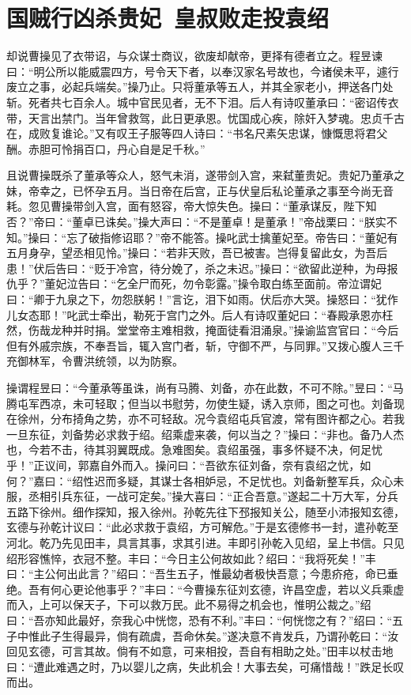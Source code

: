 \chapter{国贼行凶杀贵妃~皇叔败走投袁绍}

却说曹操见了衣带诏，与众谋士商议，欲废却献帝，更择有德者立之。程昱谏曰：“明公所以能威震四方，号令天下者，以奉汉家名号故也，今诸侯未平，遽行废立之事，必起兵端矣。”操乃止。只将董承等五人，并其全家老小，押送各门处斩。死者共七百余人。城中官民见者，无不下泪。后人有诗叹董承曰：“密诏传衣带，天言出禁门。当年曾救驾，此日更承恩。忧国成心疾，除奸入梦魂。忠贞千古在，成败复谁论。”又有叹王子服等四人诗曰：“书名尺素矢忠谋，慷慨思将君父酬。赤胆可怜捐百口，丹心自是足千秋。”

且说曹操既杀了董承等众人，怒气未消，遂带剑入宫，来弑董贵妃。贵妃乃董承之妹，帝幸之，已怀孕五月。当日帝在后宫，正与伏皇后私论董承之事至今尚无音耗。忽见曹操带剑入宫，面有怒容，帝大惊失色。操曰：“董承谋反，陛下知否？”帝曰：“董卓已诛矣。”操大声曰：“不是董卓！是董承！”帝战栗曰：“朕实不知。”操曰：“忘了破指修诏耶？”帝不能答。操叱武士擒董妃至。帝告曰：“董妃有五月身孕，望丞相见怜。”操曰：“若非天败，吾已被害。岂得复留此女，为吾后患！”伏后告曰：“贬于冷宫，待分娩了，杀之未迟。”操曰：“欲留此逆种，为母报仇乎？”董妃泣告曰：“乞全尸而死，勿令彰露。”操令取白练至面前。帝泣谓妃曰：“卿于九泉之下，勿怨朕躬！”言讫，泪下如雨。伏后亦大哭。操怒曰：“犹作儿女态耶！”叱武士牵出，勒死于宫门之外。后人有诗叹董妃曰：“春殿承恩亦枉然，伤哉龙种并时捐。堂堂帝主难相救，掩面徒看泪涌泉。”操谕监宫官曰：“今后但有外戚宗族，不奉吾旨，辄入宫门者，斩，守御不严，与同罪。”又拨心腹人三千充御林军，令曹洪统领，以为防察。

操谓程昱曰：“今董承等虽诛，尚有马腾、刘备，亦在此数，不可不除。”昱曰：“马腾屯军西凉，未可轻取；但当以书慰劳，勿使生疑，诱入京师，图之可也。刘备现在徐州，分布掎角之势，亦不可轻敌。况今袁绍屯兵官渡，常有图许都之心。若我一旦东征，刘备势必求救于绍。绍乘虚来袭，何以当之？”操曰：“非也。备乃人杰也，今若不击，待其羽翼既成。急难图矣。袁绍虽强，事多怀疑不决，何足忧乎！”正议间，郭嘉自外而入。操问曰：“吾欲东征刘备，奈有袁绍之忧，如何？”嘉曰：“绍性迟而多疑，其谋士各相妒忌，不足忧也。刘备新整军兵，众心未服，丞相引兵东征，一战可定矣。”操大喜曰：“正合吾意。”遂起二十万大军，分兵五路下徐州。细作探知，报入徐州。孙乾先往下邳报知关公，随至小沛报知玄德，玄德与孙乾计议曰：“此必求救于袁绍，方可解危。”于是玄德修书一封，遣孙乾至河北。乾乃先见田丰，具言其事，求其引进。丰即引孙乾入见绍，呈上书信。只见绍形容憔悴，衣冠不整。丰曰：“今日主公何故如此？绍曰：“我将死矣！”丰曰：“主公何出此言？”绍曰：“吾生五子，惟最幼者极快吾意；今患疥疮，命已垂绝。吾有何心更论他事乎？”丰曰：“今曹操东征刘玄德，许昌空虚，若以义兵乘虚而入，上可以保天子，下可以救万民。此不易得之机会也，惟明公裁之。”绍曰：“吾亦知此最好，奈我心中恍惚，恐有不利。”丰曰：“何恍惚之有？”绍曰：“五子中惟此子生得最异，倘有疏虞，吾命休矣。”遂决意不肯发兵，乃谓孙乾曰：“汝回见玄德，可言其故。倘有不如意，可来相投，吾自有相助之处。”田丰以杖击地曰：“遭此难遇之时，乃以婴儿之病，失此机会！大事去矣，可痛惜哉！”跌足长叹而出。

